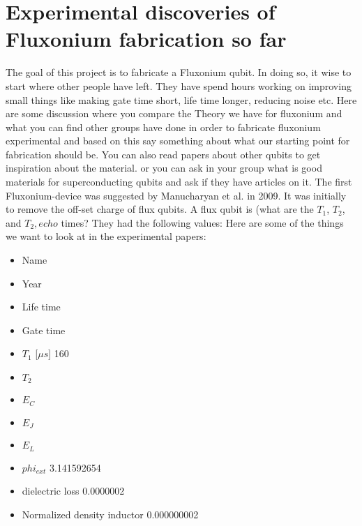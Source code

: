 \chapter{Experimental discoveries of Fluxonium fabrication so far}
    The goal of this project is to fabricate a Fluxonium qubit. 
    In doing so, it wise to start where other people have left. They have spend hours working on improving small things like making gate time short, life time longer, reducing noise etc. 
    \newline
    \newline
    Here are some discussion where you compare the Theory we have for fluxonium and what you can find other groups have done in order to fabricate fluxonium experimental and based on this say something about what our starting point for fabrication should be. You can also read papers about other qubits to get inspiration about the material. or you can ask in your group what is good materials for superconducting qubits and ask if they have articles on it. 
    \newline
    \newline 
    The first Fluxonium-device was suggested by Manucharyan et al. in 2009. It was initially to remove the off-set charge of flux qubits. A flux qubit is (what are the $T_1$, $T_2$, and $T_2,echo$ times? They had the following values:
    Here are some of the things we want to look at in the experimental papers: 
        \begin{itemize}
            \item Name	
            \item Year	
            \item Life time	
            \item Gate time	
            \item $T_1$ [$\mu s$]	160
            \item $T_2$	
            \item $E_C$	
            \item $E_J$	
            \item $E_L$ 	
            \item $phi_{ext}$	3.141592654
            \item dielectric loss	0.0000002
            \item Normalized density inductor	0.000000002
        \end{itemize}
    
